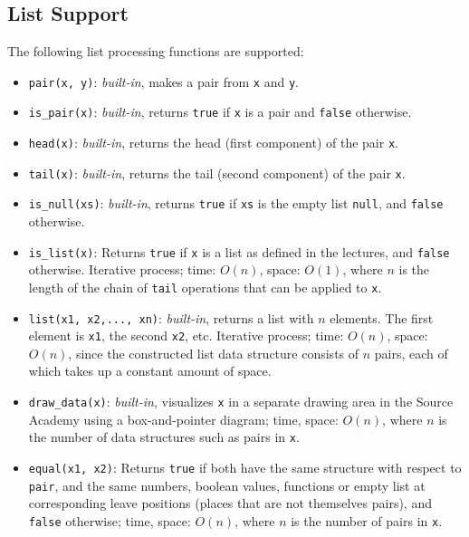 \subsection*{List Support}

The following list processing functions are supported:

\begin{itemize}
\item \lstinline{pair(x, y)}: \textit{built-in}, makes a pair from \lstinline{x} and \lstinline{y}.
\item \lstinline{is_pair(x)}: \textit{built-in}, returns \lstinline{true} if \lstinline{x} is a
  pair and \lstinline{false} otherwise.
\item \lstinline{head(x)}: \textit{built-in}, returns the head (first component) of the pair \lstinline{x}.
\item \lstinline{tail(x)}: \textit{built-in}, returns the tail (second component) of the
  pair \lstinline{x}.
\item \lstinline{is_null(xs)}: \textit{built-in}, returns \lstinline{true} if \lstinline{xs} is the
  empty list \lstinline{null}, and \lstinline{false} otherwise.
\item \lstinline{is_list(x)}: Returns \lstinline{true} if
  \lstinline{x} is a list as defined in the lectures, and
  \lstinline{false} otherwise. Iterative process; 
time: $O(n)$, space: $O(1)$, where $n$ is the length of the 
chain of \lstinline{tail} operations that can be applied to \lstinline{x}.
\item \lstinline{list(x1, x2,..., xn)}: \textit{built-in}, returns a list with $n$ elements. The
first element is \lstinline{x1}, the second \lstinline{x2}, etc. Iterative
process; time: $O(n)$, space: $O(n)$, since the constructed list data structure
consists of $n$ pairs, each of which takes up a constant amount of space.
\item \lstinline{draw_data(x)}: \textit{built-in}, visualizes \lstinline{x} in a separate drawing
  area in the Source Academy using a box-and-pointer diagram; time, space:
  $O(n)$, where $n$ is the number of data structures such as
  pairs in \lstinline{x}.
\item \lstinline{equal(x1, x2)}: Returns \lstinline{true} if both
  have the same structure with respect to \lstinline{pair},
  and the same numbers, boolean values, functions or empty list
  at corresponding leave positions (places that are not themselves pairs),
  and \lstinline{false} otherwise; time, space:
  $O(n)$, where $n$ is the number of pairs in \lstinline{x}.

\end{itemize}

